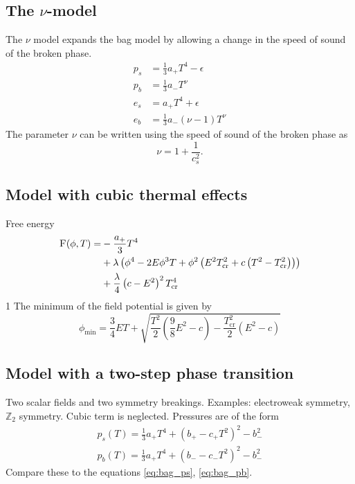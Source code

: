 \subsection{The $\nu$-model}
The $\nu$ model expands the bag model by allowing a change in the speed of sound of the broken phase.
\cite[eq. 38]{giese_2020}
\begin{align}
p_s &= \frac{1}{3} a_+ T^4 - \epsilon \\
p_b &= \frac{1}{3} a_- T^\nu \\
e_s &= a_+ T^4 + \epsilon \\
e_b &= \frac{1}{3} a_- (\nu - 1) T^\nu
\end{align}
The parameter $\nu$ can be written using the speed of sound of the broken phase as
\cite[eq. 39]{giese_2020}
\begin{equation}
\nu = 1 + \frac{1}{c_s^2}.
\end{equation}

\subsection{Model with cubic thermal effects}
Free energy
\cite[eq. 45]{giese_2020}
\begin{align}
\begin{split}
\textsc{F}(\phi, T) =
&- \frac{a_+}{3} T^4 \\
&+ \lambda \left( \phi^4 - 2E\phi^3 T + \phi^2 \left( E^2 T_\text{cr}^2 + c \left( T^2 - T_\text{cr}^2 \right) \right) \right) \\
&+ \frac{\lambda}{4} \left( c - E^2 \right)^2 T_\text{cr}^4
\end{split}
\end{align}
1
The minimum of the field potential is given by
\cite[eq. 46]{giese_2020}
\begin{equation}
\phi_\text{min} = \frac{3}{4} ET + \sqrt{\frac{T^2}{2}(\frac{9}{8}E^2 - c) - \frac{T_\text{cr}^2}{2} (E^2 - c)}
\end{equation}

\subsection{Model with a two-step phase transition}
Two scalar fields and two symmetry breakings. Examples: electroweak symmetry, $\mathbb{Z}_2$ symmetry.
Cubic term is neglected.
Pressures are of the form
\cite[eq. 47-48]{giese_2020}
\begin{align}
p_s(T) = \frac{1}{3}a_+ T^4 + (b_+ - c_+ T^2)^2 - b_-^2 \\
p_b(T) = \frac{1}{3}a_+ T^4 + (b_- - c_-T^2)^2 - b_-^2
\end{align}
Compare these to the equations \ref{eq:bag_ps}, \ref{eq:bag_pb}.



